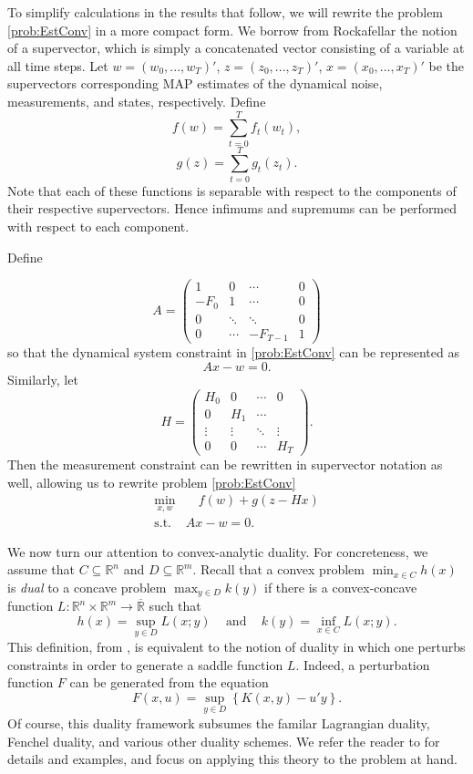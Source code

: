\documentclass[12pt]{article}
\theoremstyle{remark}
\theoremstyle{remark}
\begin{document}
To simplify calculations in the results that follow, we will rewrite the
problem \ref{prob:EstConv} in a more compact form. We borrow from Rockafellar \cite{MultStochDual} the
notion of a supervector, which is simply a concatenated vector consisting of a
variable at all time steps. Let $w=(w_{0},...,w_{T})'$,
$z=(z_{0},...,z_{T})'$, $x=(x_{0},...,x_{T})'$ be the supervectors
corresponding MAP estimates of the dynamical noise, measurements, and states,
respectively. Define 
$$f(w)=\sum_{t=0}^{T} f_{t}(w_{t}),$$
$$g(z) = \sum_{t=0}^{T} g_{t}(z_{t}).$$
Note that each of these functions is separable with respect to the
components of their respective supervectors. Hence infimums and
supremums can be performed with respect to each component.

Define 

$$A = \left( \begin{array}{cccc} 1 & 0 & \cdots & 0 \\ -F_{0} & 1 &
\cdots & 0 \\ 0 & \ddots & \ddots & 0 \\ 0 & \cdots & -F_{T-1} & 1
\end{array} \right)$$
so that the dynamical system constraint in \ref{prob:EstConv} can be
represented as 
\begin{equation}\label{dynconst}
Ax - w = 0.
\end{equation}
Similarly, let 
$$H = \left( \begin{array}{cccc} H_{0} & 0 & \cdots & 0 \\ 0 & H_{1} &
\cdots & \\ \vdots & \vdots & \ddots & \vdots \\ 0 & 0 & \cdots &
H_{T} \end{array} \right).$$
Then the measurement constraint can be rewritten in supervector
notation as well, allowing us to rewrite problem \ref{prob:EstConv} 
\begin{align} \label{Supervector}
\min_{x, w} & \quad f(w) + g(z-Hx) \\
\text{s.t. } & Ax - w = 0.\nonumber
\end{align}

We now turn our attention to convex-analytic duality. For
concreteness, we assume that $C \subseteq \mathbb{R}^n$ and $D \subseteq
\mathbb{R}^m$. Recall that a convex problem
$\min_{x \in C} h(x)$ is \emph{dual} to a concave problem $\max_{y
\in D} k(y)$ if there is a convex-concave function $L: \mathbb{R}^{n}
\times \mathbb{R}^m \to \overline{\mathbb{R}}$ such that
$$h(x) = \sup_{y \in D} L(x;y) \;\;\; \text{ and } \;\;\; k(y) =
\inf_{x \in C} L(x;y).$$
This definition, from \cite{ConjDual}, is equivalent to the notion of
duality in which one perturbs constraints in order to
generate a saddle function $L$. Indeed, a perturbation function $F$ can be
generated from the equation 
$$F(x,u) = \sup_{y \in D} \left\{ K(x,y) - u'y \right\}.$$
Of course, this duality framework subsumes the familar Lagrangian
duality, Fenchel duality, and various other duality schemes.
We refer the reader to \cite{ConjDual}
for details and examples, and focus on applying
this theory to the problem at hand.
\end{document}
